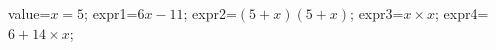 \documentclass[exercice]{thedocument}%
\begin{document}
%
\>value=$x=5$;%
\>expr1=$6x-11$;%
\>expr2=$(5+x)(5+x)$;%
\>expr3=$x\times x$;%
\>expr4=$6+14\times x$;%
%
\end{document}
